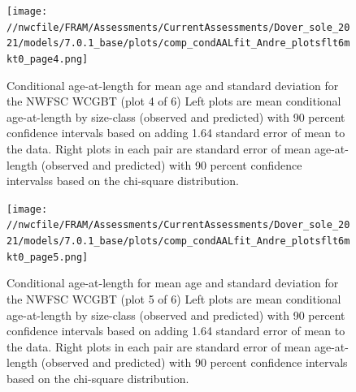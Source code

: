 \documentclass[11pt,
  english,
  a4paper,
]{article}
\begin{document}
\tagmcend\tagstructend


\begin{figure}
\centering
\texttt{[image: //nwcfile/FRAM/Assessments/CurrentAssessments/Dover\_sole\_2021/models/7.0.1\_base/plots/comp\_condAALfit\_Andre\_plotsflt6mkt0\_page4.png]}
\caption{Conditional age-at-length for mean age and standard deviation for the NWFSC WCGBT (plot 4 of 6) Left plots are mean conditional age-at-length by size-class (observed and predicted) with 90 percent confidence intervals based on adding 1.64 standard error of mean to the data. Right plots in each pair are standard error of mean age-at-length (observed and predicted) with 90 percent confidence intervalss based on the chi-square distribution.\label{fig:wcgbt-caal-fit-4}}
\end{figure}

\tagmcend\tagstructend


\begin{figure}
\centering
\texttt{[image: //nwcfile/FRAM/Assessments/CurrentAssessments/Dover\_sole\_2021/models/7.0.1\_base/plots/comp\_condAALfit\_Andre\_plotsflt6mkt0\_page5.png]}
\caption{Conditional age-at-length for mean age and standard deviation for the NWFSC WCGBT (plot 5 of 6) Left plots are mean conditional age-at-length by size-class (observed and predicted) with 90 percent confidence intervals based on adding 1.64 standard error of mean to the data. Right plots in each pair are standard error of mean age-at-length (observed and predicted) with 90 percent confidence intervals based on the chi-square distribution.\label{fig:wcgbt-caal-fit-5}}
\end{figure}
\end{document}
